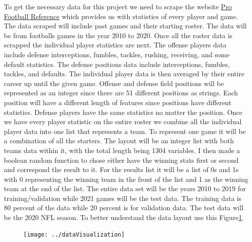 \documentclass[12pt]{IEEEtran}
\begin{document}
To get the necessary data for this project we need to scrape the website  \href{https://www.pro-football-reference.com/}{Pro Football Reference} which provides us with statistics of every player and game. The data scraped will include past games and their starting roster. The data will be from footballs games in the year 2010 to 2020. Once all the roster data is scrapped the individual player statistics are next. The offense players data include defense interceptions, fumbles, tackles, rushing, receiving, and some default statistics. The defense positions data include interceptions, fumbles, tackles, and defaults. The individual player data is then averaged by their entire career up until the given game. Offense and defense field positions will be represented as an integer since there are 51 different positions as strings. Each position will have a different length of features since positions have different statistics. Defense players have the same statistics no matter the position. Once we have every player statistic on the entire roster we combine all the individual player data into one list that represents a team. To represent one game it will be a combination of all the starters. The layout will be an integer list with both teams data within it, with the total length being 1304 variables. I then made a boolean random function to chose either have the winning stats first or second and correspond the result to it. For the results list it will be a list of 0s and 1s with 0 representing the winning team in the front of the list and 1 as the winning team at the end of the list. The entire data set will be the years 2010 to 2019 for training/validation while 2021 games will be the test data. The training data is 80 percent of the data while 20 percent is for validation data. The test data will be the 2020 NFL season. To better understand the data layout use this Figure\ref{fig:datavisualization}. 

\begin{figure}
	\centering
	\texttt{[image: ../dataVisualization]}
	\caption{}
	\label{fig:datavisualization}
\end{figure}
\end{document}
